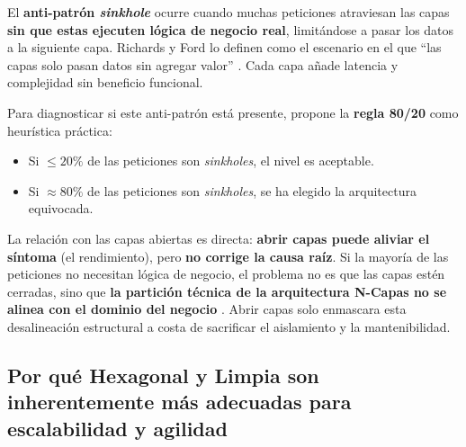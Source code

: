 \documentclass[12pt,a4paper]{article}
\begin{document}
El \textbf{anti-patrón \textit{sinkhole}} ocurre cuando muchas peticiones atraviesan las capas \textbf{sin que estas ejecuten lógica de negocio real}, limitándose a pasar los datos a la siguiente capa. Richards y Ford lo definen como el escenario en el que ``las capas solo pasan datos sin agregar valor'' \citep{richards2020}. Cada capa añade latencia y complejidad sin beneficio funcional.

Para diagnosticar si este anti-patrón está presente, \citep{richards2015} propone la \textbf{regla 80/20} como heurística práctica:
\begin{itemize}
    \item Si \(\leq 20\%\) de las peticiones son \textit{sinkholes}, el nivel es aceptable.
    \item Si \(\approx 80\%\) de las peticiones son \textit{sinkholes}, se ha elegido la arquitectura equivocada.
\end{itemize}

La relación con las capas abiertas es directa: \textbf{abrir capas puede aliviar el síntoma} (el rendimiento), pero \textbf{no corrige la causa raíz}. Si la mayoría de las peticiones no necesitan lógica de negocio, el problema no es que las capas estén cerradas, sino que \textbf{la partición técnica de la arquitectura N-Capas no se alinea con el dominio del negocio} \citep{richards2015}. Abrir capas solo enmascara esta desalineación estructural a costa de sacrificar el aislamiento y la mantenibilidad.

\subsection{Por qué Hexagonal y Limpia son inherentemente más adecuadas para escalabilidad y agilidad}
\end{document}
